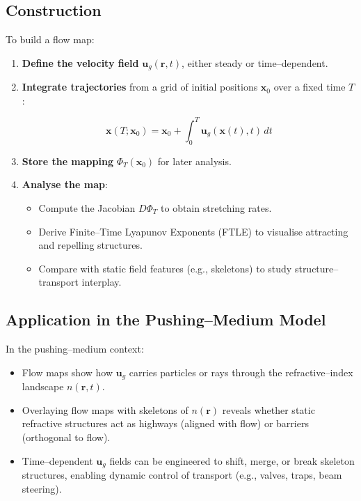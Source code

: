 \subsection*{Construction}
To build a flow map:
\begin{enumerate}
    \item \textbf{Define the velocity field} $\mathbf{u}_g(\mathbf{r},t)$, either steady or time--dependent.
    \item \textbf{Integrate trajectories} from a grid of initial positions $\mathbf{x}_0$ over a fixed time $T$:
    

\[
    \mathbf{x}(T; \mathbf{x}_0) = \mathbf{x}_0 + \int_0^T \mathbf{u}_g(\mathbf{x}(t), t) \, dt
    \]


    \item \textbf{Store the mapping} $\Phi_T(\mathbf{x}_0)$ for later analysis.
    \item \textbf{Analyse the map}:
    \begin{itemize}
        \item Compute the Jacobian $D\Phi_T$ to obtain stretching rates.
        \item Derive Finite--Time Lyapunov Exponents (FTLE) to visualise attracting and repelling structures.
        \item Compare with static field features (e.g., skeletons) to study structure--transport interplay.
    \end{itemize}
\end{enumerate}

\subsection*{Application in the Pushing--Medium Model}
In the pushing--medium context:
\begin{itemize}
    \item Flow maps show how $\mathbf{u}_g$ carries particles or rays through the refractive--index landscape $n(\mathbf{r},t)$.
    \item Overlaying flow maps with skeletons of $n(\mathbf{r})$ reveals whether static refractive structures act as highways (aligned with flow) or barriers (orthogonal to flow).
    \item Time--dependent $\mathbf{u}_g$ fields can be engineered to shift, merge, or break skeleton structures, enabling dynamic control of transport (e.g., valves, traps, beam steering).
\end{itemize}

